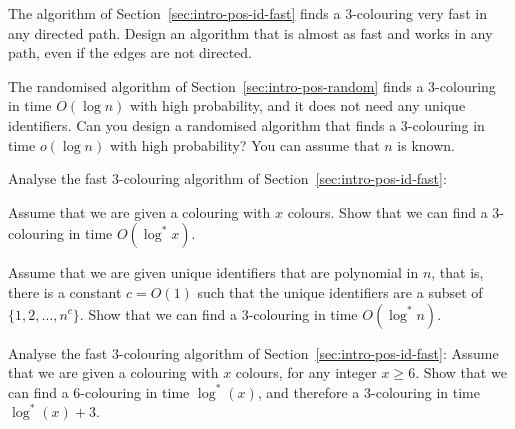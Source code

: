 \begin{ex}\label{ex:intro-undir-path}
    The algorithm of Section~\ref{sec:intro-pos-id-fast} finds a $3$-colouring very fast in any directed path. Design an algorithm that is almost as fast and works in any path, even if the edges are not directed.

\end{ex}

\begin{ex}
    The randomised algorithm of Section~\ref{sec:intro-pos-random} finds a $3$-colouring in time $O(\log n)$ with high probability, and it does not need any unique identifiers. Can you design a randomised algorithm that finds a $3$-colouring in time $o(\log n)$ with high probability? You can assume that $n$ is known.

\end{ex}

\begin{ex}\label{ex:logstar}
    Analyse the fast $3$-colouring algorithm of Section~\ref{sec:intro-pos-id-fast}:
    \begin{subex}
        \item Assume that we are given a colouring with $x$ colours. Show that we can find a $3$-colouring in time $O(\log^* x)$.
        \item Assume that we are given unique identifiers that are polynomial in $n$, that is, there is a constant $c = O(1)$ such that the unique identifiers are a subset of $\{1,2,\dotsc,n^c\}$. Show that we can find a $3$-colouring in time $O(\log^* n)$.
    \end{subex}
\end{ex}

\begin{exs}\label{ex:logstar-tight}
    Analyse the fast $3$-colouring algorithm of Section~\ref{sec:intro-pos-id-fast}:
    Assume that we are given a colouring with $x$ colours, for any integer $x \ge 6$. Show that we can find a $6$-colouring in time $\log^*(x)$, and therefore a $3$-colouring in time $\log^*(x) + 3$.
\end{exs}

